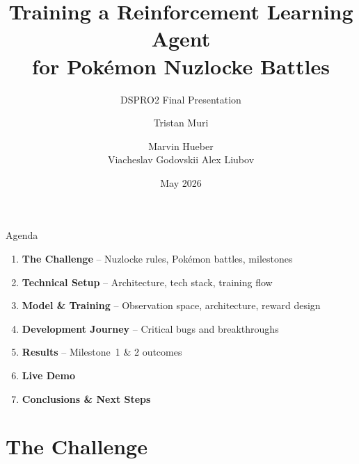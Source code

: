 \documentclass[aspectratio=169, 11pt]{beamer}
\title[Pok\'{e}mon Nuzlocke RL]{Training a Reinforcement Learning Agent\\for Pok\'{e}mon Nuzlocke Battles}
\subtitle{DSPRO2 Final Presentation}
\author[Muri, Hueber]{%
  Tristan Muri \and Marvin Hueber \\[0.3em]
  {\small Viacheslav Godovskii \quad Alex Liubov}}
\institute[HSLU]{Hochschule Luzern -- DSPRO2 FS26}
\date{May 2026}
\begin{document}
\begin{frame}[plain]
  \titlepage
\end{frame}

\begin{frame}{Agenda}
  \begin{enumerate}\setlength{\itemsep}{0.6em}
    \item \textbf{The Challenge} -- Nuzlocke rules, Pok\'{e}mon battles, milestones
    \item \textbf{Technical Setup} -- Architecture, tech stack, training flow
    \item \textbf{Model \& Training} -- Observation space, architecture, reward design
    \item \textbf{Development Journey} -- Critical bugs and breakthroughs
    \item \textbf{Results} -- Milestone~1 \& 2 outcomes
    \item \textbf{Live Demo}
    \item \textbf{Conclusions \& Next Steps}
  \end{enumerate}
\end{frame}

\section{The Challenge}
\end{document}
